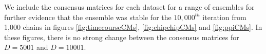 \documentclass[]{article}
\begin{document}

We include the consensus matrices for each dataset for a range of ensembles for further evidence that the ensemble was stable for the $10,000^{th}$ iteration from 1,000 chains in figures \ref{fig:timecourseCMs}, \ref{fig:chipchipCMs} and \ref{fig:ppiCMs}. In these figures, there is no strong change between the consensus matrices for $D=5001$ and $D=10001$.
\end{document}
